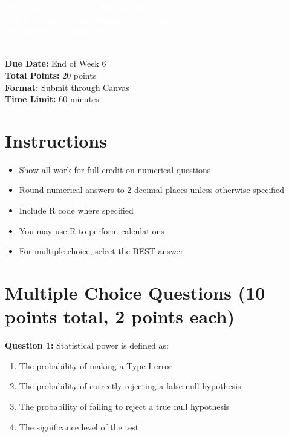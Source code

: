 \documentclass[11pt]{article}
\title{}
\author{}
\date{}
\begin{document}
\begin{tcolorbox}[colback=osaorange,colframe=black,boxrule=2pt,arc=0pt,left=3pt,right=3pt,top=6pt,bottom=6pt,boxsep=2pt]
\centering
\textcolor{white}{\textbf{\Large H524 Introduction to Biostatistics}}\\
\textcolor{white}{\textbf{\Large Week 6: Power, Two-Sample Tests, and ANOVA}}\\
\textcolor{white}{\textbf{\Large Homework Assignment}}\\
\textcolor{white}{\textbf{\Large Fall 2025}}
\end{tcolorbox}

\vspace{8pt}

\noindent\textbf{Due Date:} End of Week 6\\
\textbf{Total Points:} 20 points\\
\textbf{Format:} Submit through Canvas\\
\textbf{Time Limit:} 60 minutes

\section*{Instructions}

\begin{itemize}
\item Show all work for full credit on numerical questions
\item Round numerical answers to 2 decimal places unless otherwise specified
\item Include R code where specified
\item You may use R to perform calculations
\item For multiple choice, select the BEST answer
\end{itemize}

\section{Multiple Choice Questions (10 points total, 2 points each)}

\textbf{Question 1:} Statistical power is defined as:

\begin{enumerate}[label=\Alph*.]
\item The probability of making a Type I error
\item The probability of correctly rejecting a false null hypothesis
\item The probability of failing to reject a true null hypothesis
\item The significance level of the test
\end{enumerate}
\end{document}
